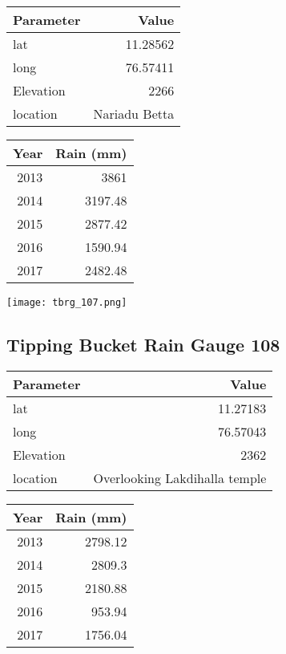 \documentclass[a4paper]{article}
\begin{document}
\begin{center}
\begin{tabular}{lr}
Parameter & Value\\
\hline
lat & 11.28562\\
long & 76.57411\\
Elevation & 2266\\
location & Nariadu Betta\\
\end{tabular}
\end{center}

\begin{center}
\begin{tabular}{rr}
Year & Rain (mm)\\
\hline
2013 & 3861\\
2014 & 3197.48\\
2015 & 2877.42\\
2016 & 1590.94\\
2017 & 2482.48\\
\end{tabular}
\end{center}

\begin{center}
\texttt{[image: tbrg\_107.png]}
\end{center}


\newpage

\subsection*{Tipping Bucket Rain Gauge 108}
\label{sec:org03ce271}

\begin{center}
\begin{tabular}{lr}
Parameter & Value\\
\hline
lat & 11.27183\\
long & 76.57043\\
Elevation & 2362\\
location & Overlooking Lakdihalla temple\\
\end{tabular}
\end{center}

\begin{center}
\begin{tabular}{rr}
Year & Rain (mm)\\
\hline
2013 & 2798.12\\
2014 & 2809.3\\
2015 & 2180.88\\
2016 & 953.94\\
2017 & 1756.04\\
\end{tabular}
\end{center}
\end{document}
